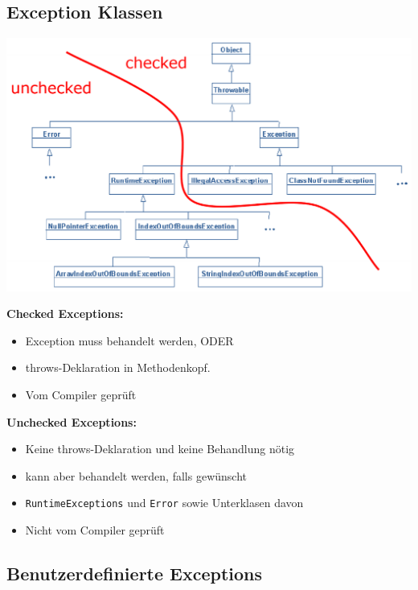 	\subsection*{Exception Klassen}
		\begin{minipage}{9cm}
			\includegraphics[width=\columnwidth]{pics/Exception_hierarchy.png}
		\end{minipage}
		\hspace*{0.5cm}
		\begin{minipage}{9.3cm}
			\textbf{Checked Exceptions:}\vspace{-0.2cm}
			\begin{itemize}[noitemsep]
				\item Exception muss behandelt werden, ODER
				\item throws-Deklaration in Methodenkopf.
				\item Vom Compiler geprüft
			\end{itemize}
			\textbf{Unchecked Exceptions:}\vspace*{-0.2cm}
			\begin{itemize}[noitemsep]
				\item Keine throws-Deklaration und keine Behandlung nötig
				\item kann aber behandelt werden, falls gewünscht
				\item \texttt{RuntimeExceptions} und \texttt{Error} sowie Unterklasen davon
				\item Nicht vom Compiler geprüft
			\end{itemize}
		\end{minipage}
	\subsection*{Benutzerdefinierte Exceptions}
		
